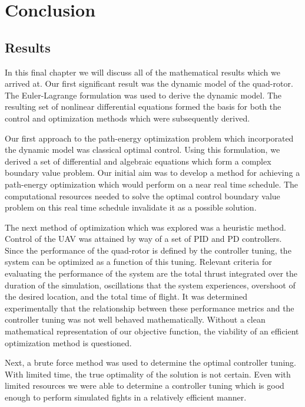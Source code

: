 
\chapter{Conclusion} %

\label{Chapter8} 


\section{Results}

In this final chapter we will discuss all of the mathematical results which we arrived at. Our first significant result was the dynamic model of the quad-rotor. The Euler-Lagrange formulation was used to derive the dynamic model. The resulting set of nonlinear differential equations formed the basis for both the control and optimization methods which were subsequently derived.

Our first approach to the path-energy optimization problem which incorporated the dynamic model was classical optimal control. Using this formulation, we derived a set of differential and algebraic equations which form a complex boundary value problem. Our initial aim was to develop a method for achieving a path-energy optimization which would perform on a near real time schedule. The computational resources needed to solve the optimal control boundary value problem on this real time schedule invalidate it as a possible solution.

The next method of optimization which was explored was a heuristic method. Control of the UAV was attained by way of a set of PID and PD controllers. Since the performance of the quad-rotor is defined by the controller tuning, the system can be optimized as a function of this tuning. Relevant criteria for evaluating the performance of the system are the total thrust integrated over the duration of the simulation, oscillations that the system experiences, overshoot of the desired location, and the total time of flight. It was determined experimentally that the relationship between these performance metrics and the controller tuning was not well behaved mathematically. Without a clean mathematical representation of our objective function, the viability of an efficient optimization method is questioned.

Next, a brute force method was used to determine the optimal controller tuning. With limited time, the true optimality of the solution is not certain. Even with limited resources we were able to determine a controller tuning which is good enough to perform simulated fights in a relatively efficient manner. 

